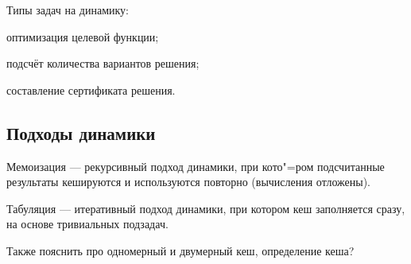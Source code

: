 {\ital Типы} задач на динамику:

\begin{list*}
\item оптимизация целевой функции;
\item подсчёт количества вариантов решения;
\item составление сертификата решения.
\end{list*}

\subsection{Подходы динамики}

{\bold Мемоизация} --- {\ital рекурсивный} подход динамики, при кото"=ром подсчитанные результаты {\ital кешируются} и используются повторно {\ital\color{desc}(вычисления отложены)}.

{\bold Табуляция} --- {\ital итеративный} подход динамики, при котором кеш заполняется сразу, на основе тривиальных подзадач.

Также пояснить про одномерный и двумерный кеш, определение кеша?
